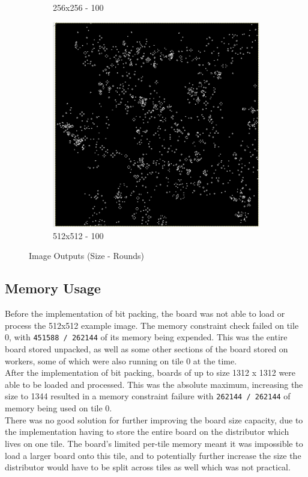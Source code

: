 \documentclass[]{article}
\begin{document}
\begin{figure}[!htb]
\begin{subfigure}{0.16\textwidth}
	\caption{256x256 - 100}
\end{subfigure}
\begin{subfigure}{0.16\textwidth}
	\centering
	\includegraphics[width=\linewidth]{images/512x512_100_Rounds.png}
	\caption{512x512 - 100}
\end{subfigure}
\caption{Image Outputs (Size - Rounds)}
\end{figure}

\subsection{Memory Usage}
Before the implementation of bit packing, the board was not able to load or process the 512x512 example image. The memory constraint check failed on tile 0, with \texttt{451588 / 262144} of its memory being expended. This was the entire board stored unpacked, as well as some other sections of the board stored on workers, some of which were also running on tile 0 at the time.\\
After the implementation of bit packing, boards of up to size 1312 x 1312 were able to be loaded and processed. This was the absolute maximum, increasing the size to 1344 resulted in a memory constraint failure with \texttt{262144 / 262144} of memory being used on tile 0.\\
There was no good solution for further improving the board size capacity, due to the implementation having to store the entire board on the distributor which lives on one tile. The board's limited per-tile memory meant it was impossible to load a larger board onto this tile, and to potentially further increase the size the distributor would have to be split across tiles as well which was not practical.
\end{document}
